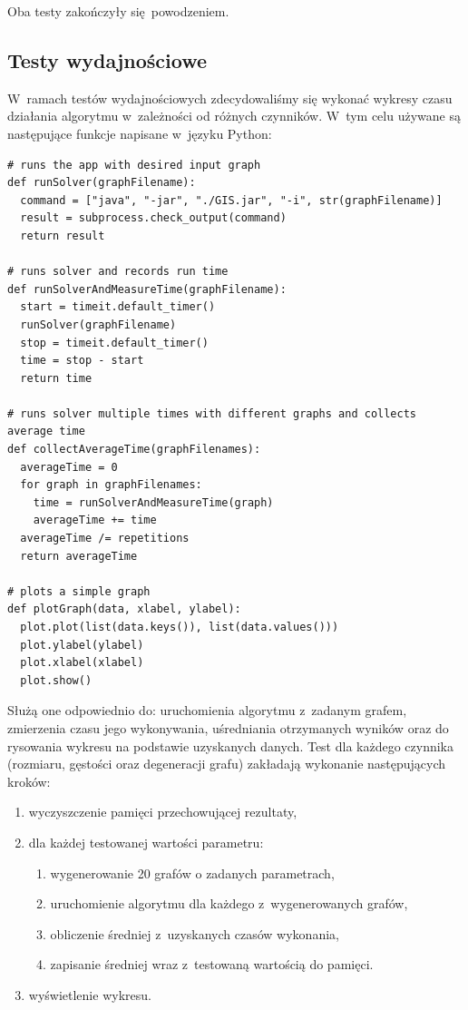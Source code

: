 \documentclass[11pt,a4paper]{article}
\begin{document}
Oba testy zakończyły się~powodzeniem.

\newpage
\subsection{Testy wydajnościowe}
W~ramach testów wydajnościowych zdecydowaliśmy się wykonać wykresy czasu działania algorytmu w~zależności od różnych czynników. W~tym celu używane są następujące funkcje napisane w~języku Python:\\

\begin{lstlisting}[caption = Funkcje pomocnicze dla testów wydajnoćiowych]
# runs the app with desired input graph
def runSolver(graphFilename):
  command = ["java", "-jar", "./GIS.jar", "-i", str(graphFilename)]
  result = subprocess.check_output(command)
  return result

# runs solver and records run time
def runSolverAndMeasureTime(graphFilename):
  start = timeit.default_timer()
  runSolver(graphFilename)
  stop = timeit.default_timer()
  time = stop - start
  return time

# runs solver multiple times with different graphs and collects average time
def collectAverageTime(graphFilenames):
  averageTime = 0
  for graph in graphFilenames:
    time = runSolverAndMeasureTime(graph)
    averageTime += time
  averageTime /= repetitions
  return averageTime

# plots a simple graph
def plotGraph(data, xlabel, ylabel):
  plot.plot(list(data.keys()), list(data.values()))
  plot.ylabel(ylabel)
  plot.xlabel(xlabel)
  plot.show()
\end{lstlisting}

Służą one odpowiednio do: uruchomienia algorytmu z~zadanym grafem, zmierzenia czasu jego wykonywania, uśredniania otrzymanych wyników oraz do rysowania wykresu na podstawie uzyskanych danych. Test dla każdego czynnika (rozmiaru, gęstości oraz degeneracji grafu) zakładają wykonanie następujących kroków:

\begin{enumerate}
  \item wyczyszczenie pamięci przechowującej rezultaty,
  \item dla każdej testowanej wartości parametru:
    \begin{enumerate}
      \item wygenerowanie 20 grafów o zadanych parametrach,
      \item uruchomienie algorytmu dla każdego z~wygenerowanych grafów,
      \item obliczenie średniej z~uzyskanych czasów wykonania,
      \item zapisanie średniej wraz z~testowaną wartością do pamięci.
    \end{enumerate}
  \item wyświetlenie wykresu.
\end{enumerate}
\end{document}
